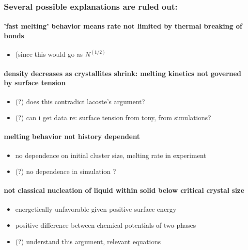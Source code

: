 \documentclass{umthesis}
\begin{document}
\subsubsection{Several possible explanations are ruled out:}
\label{sec-2.1.2.4}
\paragraph{'fast melting' behavior means rate not limited by thermal breaking of bonds}
\label{sec-2.1.2.4.1}
\begin{itemize}

\item (since this would go as $N^(1/2)$\\
\label{sec-2.1.2.4.1.1}%
\end{itemize} %
\paragraph{density decreases as crystallites shrink: melting kinetics not governed by surface tension}
\label{sec-2.1.2.4.2}
\begin{itemize}

\item (?) does this contradict lacoste's argument?\\
\label{sec-2.1.2.4.2.1}%
\item (?) can i get data re: surface tension from tony, from simulations?\\
\label{sec-2.1.2.4.2.2}%
\end{itemize} %
\paragraph{melting behavior not history dependent}
\label{sec-2.1.2.4.3}
\begin{itemize}

\item no dependence on initial cluster size, melting rate in experiment\\
\label{sec-2.1.2.4.3.1}%
\item (?) no dependence in simulation ?\\
\label{sec-2.1.2.4.3.2}%
\end{itemize} %
\paragraph{not classical nucleation of liquid within solid below critical crystal size}
\label{sec-2.1.2.4.4}
\begin{itemize}

\item energetically unfavorable given positive surface energy\\
\label{sec-2.1.2.4.4.1}%
\item positive difference between chemical potentials of two phases\\
\label{sec-2.1.2.4.4.2}%
\item (?) understand this argument, relevant equations\\
\label{sec-2.1.2.4.4.3}%
\end{itemize} %
\end{document}
